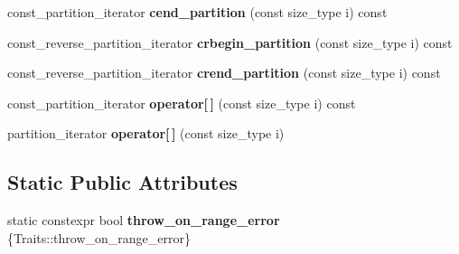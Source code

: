 \begin{DoxyCompactItemize}
$$const\+\_\+partition\+\_\+iterator {\bfseries cend\+\_\+partition} (const size\+\_\+type i) const
\item 
\mbox{\label{classsequoia_1_1data__structures_1_1bucketed__storage_aa01c3bd00dc992ab91e3655386f23201}} 
const\+\_\+reverse\+\_\+partition\+\_\+iterator {\bfseries crbegin\+\_\+partition} (const size\+\_\+type i) const
\item 
\mbox{\label{classsequoia_1_1data__structures_1_1bucketed__storage_af96fe4f38f3241f9c680429a0d7ea286}} 
const\+\_\+reverse\+\_\+partition\+\_\+iterator {\bfseries crend\+\_\+partition} (const size\+\_\+type i) const
\item 
\mbox{\label{classsequoia_1_1data__structures_1_1bucketed__storage_af8e8cb79f6fd8b8fdbd24e40e3fcce8d}} 
const\+\_\+partition\+\_\+iterator {\bfseries operator\mbox{[}$\,$\mbox{]}} (const size\+\_\+type i) const
\item 
\mbox{\label{classsequoia_1_1data__structures_1_1bucketed__storage_a81e03ed0ee713c28494ae4bb0237d613}} 
partition\+\_\+iterator {\bfseries operator\mbox{[}$\,$\mbox{]}} (const size\+\_\+type i)
\end{DoxyCompactItemize}
\subsection*{Static Public Attributes}
\begin{DoxyCompactItemize}
\item 
\mbox{\label{classsequoia_1_1data__structures_1_1bucketed__storage_ad4cefb3b274b27f7464b7af4250c1d4f}} 
static constexpr bool {\bfseries throw\+\_\+on\+\_\+range\+\_\+error} \{Traits\+::throw\+\_\+on\+\_\+range\+\_\+error\}
\end{DoxyCompactItemize}

